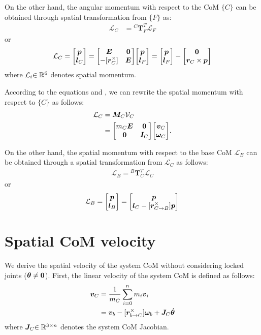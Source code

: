 On the other hand, the angular momentum with respect to the CoM $\{C\}$ can be obtained through
spatial transformation from $\{F\}$ as:
%
\begin{align}
  \mathcal{L}_{C} &= {}^{C}\bm{T}_{F}^{T}\mathcal{L}_{F}
\end{align}
%
or
%
\begin{align}
  \mathcal{L}_{C} 
  = {\begin{bmatrix} \bm{p} \\ \bm{l}_{C} \end{bmatrix}} = {\begin{bmatrix} \bm{E} & \bm{0} \\ -[\bm{r}_{C}^{\times}] & \bm{E} \end{bmatrix}}{\begin{bmatrix} \bm{p} \\ \bm{l}_{F} \end{bmatrix}}
  = {\begin{bmatrix} \bm{p} \\ \bm{l}_{F} \end{bmatrix}} - {\begin{bmatrix} \bm{0}\\\bm{r}_{C}\times \bm{p} \end{bmatrix}}\label{eq:APP_ANG_MOM_C}
\end{align}
%
where $\mathcal{L}_{i}{\in\mathbb{R}^{6}}$ denotes spatial momentum.

According to the equations  and ,
we can rewrite the spatial momentum with respect to $\{C\}$ as follows:
%
\begin{align}
  \mathcal{L}_{C} &= \bm{M}_{C}\mathcal{V}_{C}\\
  &= {\begin{bmatrix} m_{C}\bm{E} & \bm{0} \\ \bm{0} & \bm{I}_{C} \end{bmatrix}}{\begin{bmatrix} \bm{v}_{C}\\\bm{\omega}_{C} \end{bmatrix}}\label{eq:APP_LC}.
\end{align}
%

On the other hand,
the spatial momentum with respect to the base CoM $\mathcal{L}_{B}$ can be obtained
through a spatial transformation from $\mathcal{L}_{C}$ as follows:
%
\begin{align}
  \mathcal{L}_{B} = {}^{B}\bm{T}_{C}^{T}\mathcal{L}_{C}\label{eq:APP_LB_LC}
\end{align}
%
or
%
\begin{align}
  \mathcal{L}_{B} = {\begin{bmatrix} \bm{p}\\ \bm{l}_{B} \end{bmatrix}} = {\begin{bmatrix} \bm{p} \\ \bm{l}_{C} - [\bm{r}_{C \rightarrow B}^\times]\bm{p} \end{bmatrix}}
\end{align}
%

\section{Spatial CoM velocity}
We derive the spatial velocity of the system CoM without considering locked joints (${\bm{\theta}} \not = \bm{0}$).
First, the linear velocity of the system CoM is defined as follows:
%
\begin{align}
  \bm{v}_{C} &= \frac{1}{m_{C}}\sum_{i=0}^{n}m_{i}\bm{v}_{i}\\
  &= \bm{v}_{b} - [\bm{r}_{b \rightarrow C}^{\times}]\bm{\omega}_{b} + \bm{J}_{C}{\dot{\bm{\theta}}}
\end{align}
%
where $\bm{J}_{C}{\in\mathbb{R}^{3 \times n}}$ denotes the system CoM Jacobian.

